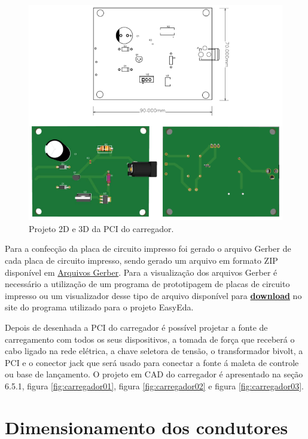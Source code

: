 \begin{figure}[!h]
	\centering
		\includegraphics[keepaspectratio=true,scale=0.8]{figuras/PCI_carregador.PNG}
	\caption{Projeto 2D e 3D da PCI do carregador.}
	\label{PCI_carregador}
\end{figure}

Para a confecção da placa de circuito impresso foi gerado o arquivo Gerber de cada placa de circuito impresso, sendo gerado um arquivo em formato ZIP disponível em \href{https://drive.google.com/drive/folders/1P1pQGE_zuSLOB5qd8zfESWqLDwtyoRKd?usp=sharing}{ Arquivos Gerber}. Para a visualização dos arquivos Gerber é necessário a utilização de um programa de prototipagem de placas de circuito impresso ou um visualizador desse tipo de arquivo disponível para \href{https://sourceforge.net/projects/gerbv/files/}{ \textbf{download}} no site do programa utilizado para o projeto EasyEda.

Depois de desenhada a PCI do carregador é possível projetar a fonte de carregamento com todos os seus dispositivos, a tomada de força que receberá o cabo ligado na rede elétrica, a chave seletora de tensão, o transformador bivolt, a PCI e o conector jack que será usado para conectar a fonte á maleta de controle ou base de lançamento. O projeto em CAD do carregador é apresentado na seção 6.5.1, figura \ref{fig:carregador01}, figura \ref{fig:carregador02} e figura \ref{fig:carregador03}. 


\section{Dimensionamento dos condutores}

